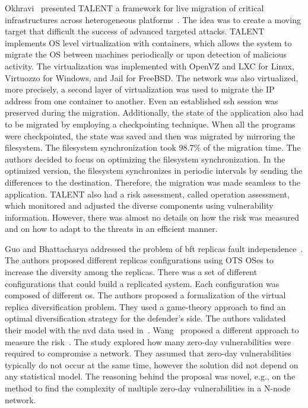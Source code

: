 Okhravi~\etal{} presented TALENT a framework for live migration of critical infrastructures across heterogeneous platforms~\cite{Okhravi:2014,Okhravi:2009}. 
The idea was to create a moving target that difficult the success of advanced targeted attacks. 
TALENT implements OS level virtualization with containers, which allows the system to migrate the OS between machines periodically or upon detection of malicious activity. 
The virtualization was implemented with OpenVZ and LXC for Linux, Virtuozzo for Windows, and Jail for FreeBSD. 
The network was also virtualized, more precisely, a second layer of virtualization was used to migrate the IP address from one container to another. 
Even an established ssh session was preserved during the migration. 
Additionally, the state of the application also had to be migrated by employing a checkpointing technique. 
When all the programs were checkpointed, the state was saved and then was migrated by mirroring the filesystem. 
The filesystem synchronization took 98.7\% of the migration time. 
The authors decided to focus on optimizing the filesystem synchronization. 
In the optimized version, the filesystem synchronizes in periodic intervals by sending the differences to the destination. 
Therefore, the migration was made seamless to the application. 
TALENT also had a risk assessment, called operation assessment, which monitored and adjusted the diverse components using vulnerability information. 
However, there was almost no details on how the risk was measured and on how to adapt to the threats in an efficient manner.

Guo and Bhattacharya addressed the problem of \gls{bft} replicas fault independence~\cite{Guo:2014}.
The authors proposed different replicas configurations using OTS OSes to increase the diversity among the replicas. 
There was a set of different configurations that could build a replicated system. 
Each configuration was composed of different \gls{os}. 
The authors proposed a formalization of the virtual replica diversification problem. 
They used a game-theory approach to find an optimal diversification strategy for the defender's side. 
The authors validated their model with the \gls{nvd} data used in~\cite{Garcia:2012}.
Wang~\etal{} proposed a different approach to measure the risk~\cite{Wang:2014}. 
The study explored how many zero-day vulnerabilities were required to compromise a network. 
They assumed that zero-day vulnerabilities typically do not occur at the same time, however the solution did not depend on any statistical model. 
The reasoning behind the proposal was novel, e.g., on the method to find the complexity of multiple zero-day vulnerabilities in a N-node network.

